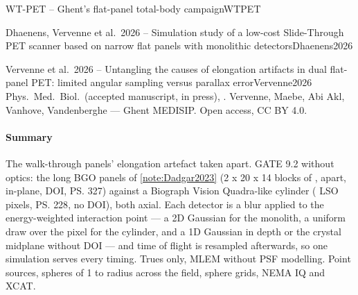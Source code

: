 \begin{programnote}{WT-PET -- Ghent's flat-panel total-body campaign}{WTPET}
\begin{papernote}{Dhaenens, Vervenne et al.\ 2026 -- Simulation study of a low-cost Slide-Through PET scanner based on narrow flat panels with monolithic detectors}{Dhaenens2026}
\end{papernote}

\begin{papernote}{Vervenne et al.\ 2026 -- Untangling the causes of elongation artifacts in dual flat-panel PET: limited angular sampling versus parallax error}{Vervenne2026}
Phys.\ Med.\ Biol.\ (accepted manuscript, in press), .
Vervenne, Maebe, Abi Akl, Vanhove, Vandenberghe --- Ghent MEDISIP. Open access,
CC BY 4.0.

\paragraph{Summary}
The walk-through panels' elongation artefact taken apart. GATE 9.2 without
optics: the long BGO panels of \ref{note:Dadgar2023} (2 x 20 x 14 blocks of
,  apart,  in-plane,  DOI,
\ps{327}) against a Biograph Vision Quadra-like cylinder ( LSO pixels,
\ps{228}, no DOI), both  axial. Each detector is a blur applied to the
energy-weighted interaction point --- a 2D Gaussian for the monolith, a uniform
draw over the pixel for the cylinder, and a 1D Gaussian in depth or the crystal
midplane without DOI --- and time of flight is resampled afterwards, so one
simulation serves every timing. Trues only, MLEM without PSF modelling. Point
sources, spheres of 1 to  radius across the field, sphere grids, NEMA IQ
and XCAT.


\end{papernote}
\end{programnote}
